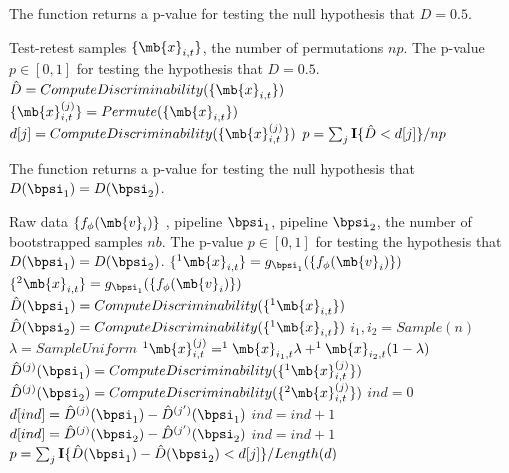\documentclass[simplex.tex]{subfiles}
\newcommand{\bv}{\mb{v}}
\newcommand{\bx}{\mb{x}}
\begin{document}
\begin{algorithm}               
	\caption{The function returns a p-value for testing the null hypothesis that $D = 0.5$.  }   
	\label{alg:ost}                       
	\begin{algorithmic}                    
		\Require Test-retest samples $\{\bx_{i,t}\}$, the number of permutations $np$.
		\Ensure The p-value $p \in [0,1]$ for testing the hypothesis that $D = 0.5$. 
		\State $\hat{D}= ComputeDiscriminability(\{\bx_{i,t}\})$ 
		\State $\{\bx^{(j)}_{i,t}\} = Permute(\{\bx_{i,t}\})$ 
		\State $d[j] = ComputeDiscriminability(\{\bx^{(j)}_{i,t}\})$ 
		\EndFor
		\State $p = \sum_j {\bf I}\{\hat{D} < d[j]\} / np$ 
		\EndFunction
	\end{algorithmic}
\end{algorithm}

\begin{algorithm}               
	\caption{The function returns a p-value for testing the null hypothesis that $D(\bpsi_1)=D(\bpsi_2)$.  }   
	\label{alg:tst}                       
	\begin{algorithmic}                    
		\Require Raw data $\{f_\phi(\bv_i)\}$ , pipeline $\bpsi_1$, pipeline $\bpsi_2$, the number of bootstrapped samples $nb$.
		\Ensure The p-value $p \in [0,1]$ for testing the hypothesis that $D(\bpsi_1)=D(\bpsi_2)$. 
		\State $\{^1\bx_{i,t}\}= g_{\bpsi_1}(\{f_\phi(\bv_i)\})$ 
		\State $\{^2\bx_{i,t}\}= g_{\bpsi_1}(\{f_\phi(\bv_i)\})$ 
		\State $\hat{D}(\bpsi_1)=ComputeDiscriminability(\{^1\bx_{i,t}\})$
		\State $\hat{D}(\bpsi_2)=ComputeDiscriminability(\{^1\bx_{i,t}\})$ 
		\State $i_1, i_2 = Sample(n)$ 
		\State $\lambda = SampleUniform$ 
		\State $^1\bx^{(j)}_{i,t} =  ^1\bx_{i_1,t} \lambda +   ^1\bx_{i_2,t}(1-\lambda)$ 
		\EndFor
		\EndFor
		\State $\hat{D}^{(j)}(\bpsi_1)=ComputeDiscriminability(\{^1\bx^{(j)}_{i,t}\})$
		\State $\hat{D}^{(j)}(\bpsi_2)=ComputeDiscriminability(\{^2\bx^{(j)}_{i,t}\})$
		\EndFor
		\State $ind = 0$
		 
		\State $d[ind] =  \hat{D}^{(j)}(\bpsi_1)-\hat{D}^{(j')}(\bpsi_1)$ 
		\State $ind = ind + 1$
		\State $d[ind] =  \hat{D}^{(j)}(\bpsi_2)-\hat{D}^{(j')}(\bpsi_2)$
		\State $ind = ind + 1$
		\EndFor
		\EndFor
		\State $p = \sum_j {\bf I}\{\hat{D}(\bpsi_1)-\hat{D}(\bpsi_2) < d[j]\} / Length(d)$ 
		\EndFunction
	\end{algorithmic}
\end{algorithm}


  
\end{document}
